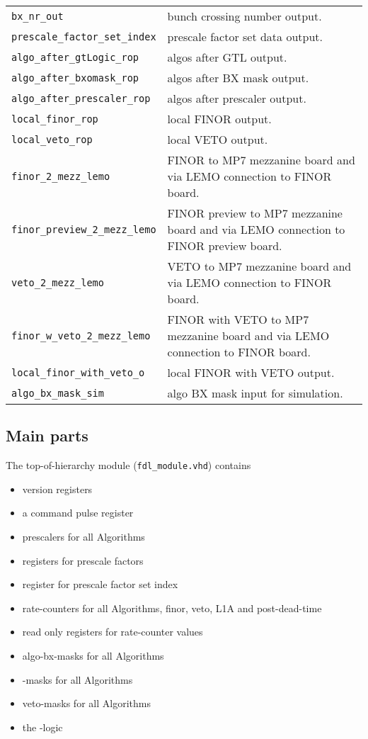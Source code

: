 \begin{table}
\begin{tabular}{l p{}}
\verb|bx_nr_out| & bunch crossing number output.\\
\verb|prescale_factor_set_index| & prescale factor set data output.\\
\verb|algo_after_gtLogic_rop| & algos after GTL output.\\
\verb|algo_after_bxomask_rop| & algos after BX mask output.\\
\verb|algo_after_prescaler_rop| & algos after prescaler output.\\
\verb|local_finor_rop| & local FINOR output.\\
\verb|local_veto_rop| & local VETO output.\\
\verb|finor_2_mezz_lemo| & FINOR to MP7 mezzanine board and via LEMO connection to FINOR board.\\
\verb|finor_preview_2_mezz_lemo| & FINOR preview to MP7 mezzanine board and via LEMO connection to FINOR preview board.\\
\verb|veto_2_mezz_lemo| & VETO to MP7 mezzanine board and via LEMO connection to FINOR board.\\
\verb|finor_w_veto_2_mezz_lemo| & FINOR with VETO to MP7 mezzanine board and via LEMO connection to FINOR board.\\
\verb|local_finor_with_veto_o| & local FINOR with VETO output.\\
\verb|algo_bx_mask_sim| & algo BX mask input for simulation.\\
\bottomrule
\end{tabular}
\label{tab:fdl:explanation_fdl_module_vhd}
\end{table}

\clearpage

\subsection{Main parts}

The top-of-hierarchy module (\texttt{fdl\_module.vhd}) contains
\begin {itemize}
\item version registers
\item a command pulse register
\item prescalers for all Algorithms
\item registers for prescale factors
\item register for prescale factor set index
\item rate-counters for all Algorithms, finor, veto, L1A and post-dead-time
\item read only registers for rate-counter values
\item algo-bx-masks for all Algorithms
\item \finor-masks for all Algorithms
\item veto-masks for all Algorithms
\item the \finor-logic
\end {itemize}

